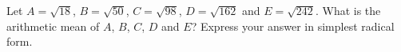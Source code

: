 Let $A=\sqrt{18}$, $B=\sqrt{50}$, $C=\sqrt{98}$, $D=\sqrt{162}$ and $E=\sqrt{242}$. What is the arithmetic mean of $A$, $B$, $C$, $D$ and $E$? Express your answer in simplest radical form.
